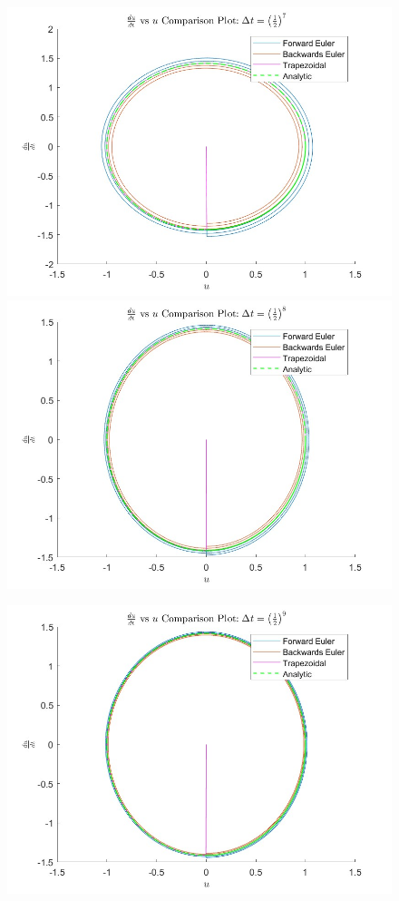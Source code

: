 \documentclass[12pt,letterpaper]{article}
\begin{document}
\begin{figure}[!h]
    \centering
    \includegraphics[width = 1\linewidth]{dudt_vs_u3.jpg}
    \includegraphics[width = 1\linewidth]{dudt_vs_u4.jpg}
\end{figure}
\newpage
\begin{figure}[!h]
    \centering
    \includegraphics[width = 1\linewidth]{dudt_vs_u5.jpg}
\end{figure}
\end{document}
